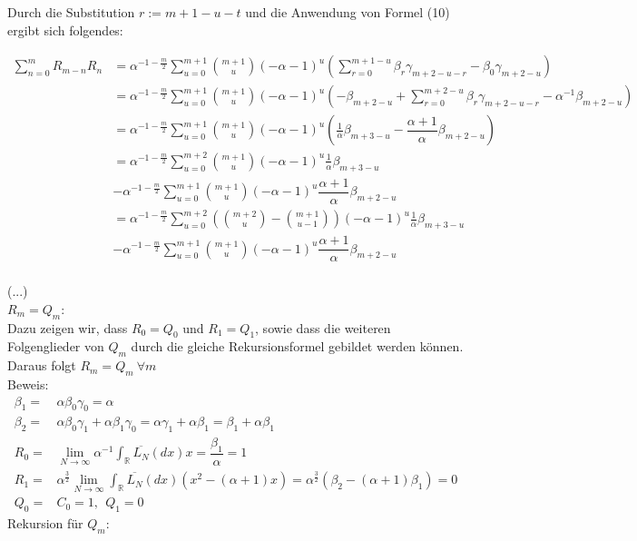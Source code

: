 \documentclass[a4paper, 11pt]{scrreprt}
\newcommand{\RR}{\mathbb{R}}
\begin{document}
Durch die Substitution $r := m+1-u-t$ und die Anwendung von Formel (10) ergibt sich folgendes:

\begin{align*}
\sum_{n=0}^m R_{m-n} R_n
&= \alpha^{-1-\frac{m}{2}} \sum_{u=0}^{m+1} \binom{m+1}{u} (-\alpha -1)^u \left( \sum_{r=0}^{m+1-u} \beta_r \gamma_{m+2-u-r} - \beta_0 \gamma_{m+2-u} \right) \\
&= \alpha^{-1-\frac{m}{2}} \sum_{u=0}^{m+1} \binom{m+1}{u} (-\alpha -1)^u \left( - \beta_{m+2-u} + \sum_{r=0}^{m+2-u} \beta_r \gamma_{m+2-u-r} - \alpha^{-1} \beta_{m+2-u}\right) \\
&= \alpha^{-1-\frac{m}{2}} \sum_{u=0}^{m+1} \binom{m+1}{u} (-\alpha -1)^u \left(\frac{1}{\alpha} \beta_{m+3-u} - \dfrac{\alpha +1}{\alpha}\beta_{m+2-u} \right) \\
&= \alpha^{-1-\frac{m}{2}} \sum_{u=0}^{m+2} \binom{m+1}{u} (-\alpha -1)^u \frac{1}{\alpha} \beta_{m+3-u} \\
&- \alpha^{-1-\frac{m}{2}} \sum_{u=0}^{m+1} \binom{m+1}{u} (-\alpha -1)^u \dfrac{\alpha +1}{\alpha}\beta_{m+2-u} \\
&= \alpha^{-1-\frac{m}{2}} \sum_{u=0}^{m+2} \left( \binom{m+2}{u} -\binom{m+1}{u-1} \right) (-\alpha -1)^u \frac{1}{\alpha} \beta_{m+3-u} \\
&- \alpha^{-1-\frac{m}{2}} \sum_{u=0}^{m+1} \binom{m+1}{u} (-\alpha -1)^u \dfrac{\alpha +1}{\alpha}\beta_{m+2-u} \\
\end{align*}

(...)\\






{$ R_m=Q_m $:}\\
Dazu zeigen wir, dass $ R_0=Q_0 $ und $ R_1=Q_1 $, sowie dass die weiteren Folgenglieder von $ Q_m $ durch die gleiche Rekursionsformel gebildet werden können. Daraus folgt $ R_m=Q_m ~ \forall m$ \\

Beweis: \begin{align*}
\beta_1=& \alpha \beta_0 \gamma_0 = \alpha \\
\beta_2=& \alpha \beta_0 \gamma_1 + \alpha \beta_1 \gamma_0 = \alpha \gamma_1 + \alpha \beta_1 = \beta_1 + \alpha \beta_1  \\
R_0 =& \lim_{N \to \infty} \alpha^{-1} \int_{\RR}\overline{L_{N}}(dx)x = \dfrac{\beta_1}{\alpha}=1 \\
R_1 =& \alpha^{\frac{3}{2}} \lim_{N \to \infty}\int_{\RR}\overline{L_{N}}(dx)(x^2 - (\alpha +1)x)= \alpha^{\frac{3}{2}} (\beta_2 - (\alpha+1)\beta_1)=0 \\
Q_0=& C_0 =1, ~~Q_1=0
\end{align*}
Rekursion für $ Q_m: $
\end{document}
